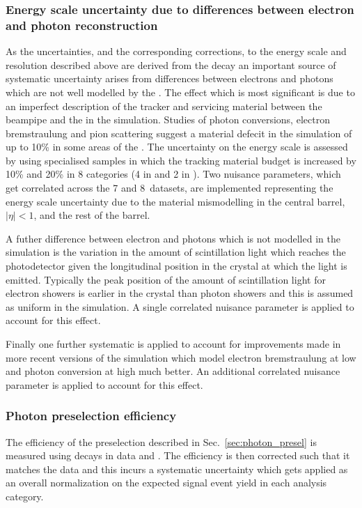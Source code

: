 \subsubsection{Energy scale uncertainty due to differences between electron and photon reconstruction}
As the uncertainties, and the corresponding corrections, to the energy scale and resolution described above are derived from the \Zee decay an important source of systematic uncertainty arises from differences between electrons and photons which are not well modelled by the \MC. The effect which is most significant is due to an imperfect description of the tracker and servicing material between the beampipe and the \ECAL in the simulation. Studies of photon conversions, electron bremstraulung and pion scattering suggest a material defecit in the simulation of up to 10\% in some areas of the \ECAL. The uncertainty on the energy scale is assessed by using specialised \MC samples in which the tracking material budget is increased by 10\% and 20\% in 8 categories (4 in \eta and 2 in \rnine). Two nuisance parameters, which get correlated across the 7 and 8~\TeV datasets, are implemented representing the energy scale uncertainty due to the material mismodelling in the central barrel, $|\eta|<1$, and the rest of the barrel.

A futher difference between electron and photons which is not modelled in the simulation is the variation in the amount of scintillation light which reaches the photodetector given the longitudinal position in the crystal at which the light is emitted. Typically the peak position of the amount of scintillation light for electron showers is earlier in the crystal than photon showers and this is assumed as uniform in the simulation. A single correlated nuisance parameter is applied to account for this effect.

Finally one further systematic is applied to account for improvements made in more recent versions of the simulation which model electron bremstraulung at low \pT and photon conversion at high \pT much better. An additional correlated nuisance parameter is applied to account for this effect.

\subsubsection{Photon preselection efficiency}

The efficiency of the preselection described in Sec.~\ref{sec:photon_presel} is measured using \Zee decays in data and \MC. The \MC efficiency is then corrected such that it matches the data and this incurs a systematic uncertainty which gets applied as an overall normalization on the expected signal event yield in each analysis category. 

